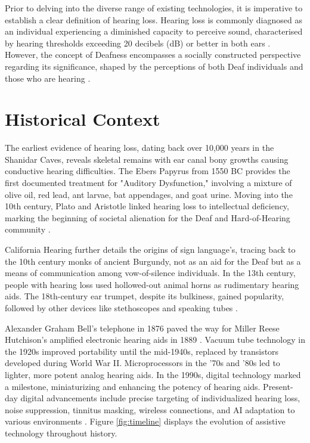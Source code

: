 \documentclass{l4proj}
\begin{document}
Prior to delving into the diverse range of existing technologies, it is imperative to establish a clear definition of hearing loss. Hearing loss is commonly diagnosed as an individual experiencing a diminished capacity to perceive sound, characterised by hearing thresholds exceeding 20 decibels (dB) or better in both ears \citep{Hapunda_2023, deafness}. However, the concept of Deafness encompasses a socially constructed perspective regarding its significance, shaped by the perceptions of both Deaf individuals and those who are hearing \citep{burrows2022not}.

\section{Historical Context}
\label{sec:his}

The earliest evidence of hearing loss, dating back over 10,000 years in the Shanidar Caves, reveals skeletal remains with ear canal bony growths causing conductive hearing difficulties. The Ebers Papyrus from 1550 BC provides the first documented treatment for "Auditory Dysfunction," involving a mixture of olive oil, red lead, ant larvae, bat appendages, and goat urine. Moving into the 10th century, Plato and Aristotle linked hearing loss to intellectual deficiency, marking the beginning of societal alienation for the Deaf and Hard-of-Hearing community \citep{CalHearing_2023}.

California Hearing \citep{CalHearing_2023} further details the origins of sign language's, tracing back to the 10th century monks of ancient Burgundy, not as an aid for the Deaf but as a means of communication among vow-of-silence individuals. In the 13th century, people with hearing loss used hollowed-out animal horns as rudimentary hearing aids. The 18th-century ear trumpet, despite its bulkiness, gained popularity, followed by other devices like stethoscopes and speaking tubes \citep{9226670}.

Alexander Graham Bell's telephone in 1876 paved the way for Miller Reese Hutchison's amplified electronic hearing aids in 1889 \citep{CalHearing_2023, 9226670}. Vacuum tube technology in the 1920s improved portability until the mid-1940s, replaced by transistors developed during World War II. Microprocessors in the '70s and '80s led to lighter, more potent analog hearing aids. In the 1990s, digital technology marked a milestone, miniaturizing and enhancing the potency of hearing aids. Present-day digital advancements include precise targeting of individualized hearing loss, noise suppression, tinnitus masking, wireless connections, and AI adaptation to various environments \citep{CalHearing_2023}. Figure \ref{fig:timeline} displays the evolution of assistive technology throughout history.
\end{document}

